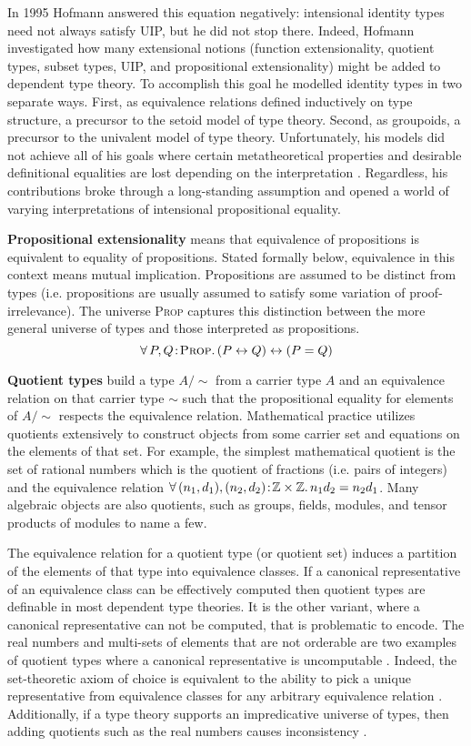 In 1995 Hofmann answered this equation negatively: intensional identity types need not always satisfy UIP, but he did not stop there.
Indeed, Hofmann investigated how many extensional notions (function extensionality, quotient types, subset types, UIP, and propositional extensionality) might be added to dependent type theory.
To accomplish this goal he modelled identity types in two separate ways.
First, as equivalence relations defined inductively on type structure, a precursor to the setoid model of type theory.
Second, as groupoids, a precursor to the univalent model of type theory.
Unfortunately, his models did not achieve all of his goals where certain metatheoretical properties and desirable definitional equalities are lost depending on the interpretation \cite{hofmann1995, hofmann1996}.
Regardless, his contributions broke through a long-standing assumption and opened a world of varying interpretations of intensional propositional equality.

\textbf{Propositional extensionality} means that equivalence of propositions is equivalent to equality of propositions.
Stated formally below, equivalence in this context means mutual implication.
Propositions are assumed to be distinct from types (i.e. propositions are usually assumed to satisfy some variation of proof-irrelevance).
The universe \textsc{Prop} captures this distinction between the more general universe of types and those interpreted as propositions.
$${\forall}\, P, Q\! : \! \textsc{Prop}.\, 
    (P \leftrightarrow Q) \leftrightarrow (P = Q)
$$

\textbf{Quotient types} build a type $A/\!\!\sim$ from a carrier type $A$ and an equivalence relation on that carrier type $\sim$ such that the propositional equality for elements of $A/\!\!\sim$ respects the equivalence relation.
Mathematical practice utilizes quotients extensively to construct objects from some carrier set and equations on the elements of that set.
For example, the simplest mathematical quotient is the set of rational numbers which is the quotient of fractions (i.e. pairs of integers) and the equivalence relation ${\forall}\, (n_1, d_1), (n_2, d_2)\! : \! \mathbb{Z \times Z}.\, n_1d_2 = n_2d_1$.
Many algebraic objects are also quotients, such as groups, fields, modules, and tensor products of modules to name a few.

The equivalence relation for a quotient type (or quotient set) induces a partition of the elements of that type into equivalence classes.
If a canonical representative of an equivalence class can be effectively computed then quotient types are definable in most dependent type theories.
It is the other variant, where a canonical representative can not be computed, that is problematic to encode.
The real numbers and multi-sets of elements that are not orderable are two examples of quotient types where a canonical representative is uncomputable \cite{li2015}.
Indeed, the set-theoretic axiom of choice is equivalent to the ability to pick a unique representative from equivalence classes for any arbitrary equivalence relation \cite{lof2009}.
Additionally, if a type theory supports an impredicative universe of types, then adding quotients such as the real numbers causes inconsistency \cite{chicli2002}.

